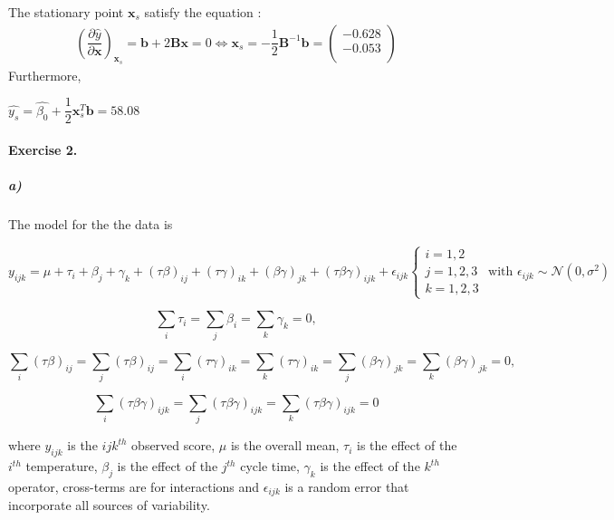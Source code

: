\documentclass{article}
\begin{document}
The stationary point $\pmb{x}_s$ satisfy the equation :
\begin{align*}
\left( \dfrac{\partial\widehat{y}}{\partial\pmb{x}}\right)_{\pmb{x}_s}=\pmb{b}+2\pmb{B}\pmb{x}=0
\iff \pmb{x}_s=-\dfrac{1}{2}\pmb{B}^{-1}\pmb{b}=\begin{pmatrix}
-0.628 \\
-0.053 \\
\end{pmatrix}
\end{align*}
Furthermore, 
\begin{center}
$\widehat{y_s}=\widehat{\beta_0}+\dfrac{1}{2}\pmb{x}_s^T\pmb{b}=58.08$
\end{center}



\paragraph{Exercise 2.}
\subparagraph{a)}
The model for the the data is \begin{center}
$$
y_{ijk}=\mu +\tau_i+\beta_j+ \gamma_k + (\tau\beta)_{ij}+ (\tau\gamma)_{ik}+ (\beta\gamma)_{jk}+ (\tau\beta\gamma)_{ijk} +\epsilon_{ijk} \left \{
    \begin{array}{ll}
        i=1,2 \\
		j=1,2,3 \\
		k=1,2,3 
    \end{array}
\right.
\text{ with } \epsilon_{ijk} \sim \mathcal{N}(0,\sigma^2)
$$
\end{center}
\begin{center}
$$\sum_i\tau_i=\sum_j\beta_i=\sum_k\gamma_k=0,$$
\end{center}
\begin{center}
 $$ \sum_i (\tau\beta)_{ij} = \sum_j (\tau\beta)_{ij} = \sum_i(\tau\gamma)_{ik}=\sum_k (\tau\gamma)_{ik}=\sum_j(\beta\gamma)_{jk}=\sum_k (\beta\gamma)_{jk}=0,$$
\end{center}
 \begin{center}
$$ \sum_i (\tau\beta\gamma)_{ijk} = \sum_j (\tau\beta\gamma)_{ijk}=\sum_k (\tau\beta\gamma)_{ijk}=0$$
\end{center}
 where $y_{ijk}$ is the $ijk^{th}$ observed score, $\mu$ is the overall mean, $\tau_i$ is the effect of the $i^{th}$ temperature, $\beta_j$ is the effect of the $j^{th}$ cycle time, $\gamma_k$ is the effect of the $k^{th}$ operator, cross-terms are for interactions and $\epsilon_{ijk}$ is a random error that incorporate all sources of variability.\\
 
\end{document}
